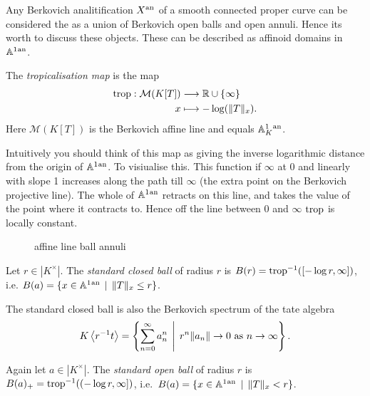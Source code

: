 Any Berkovich analitification $X{}^{\text{an}}$ of a smooth connected proper curve can be considered the as a union of Berkovich open balls and open annuli. 
Hence its worth to discuss these objects. 
These can be described as affinoid domains in $\mathbb{A}^{1}{}^{\text{an}}$. 

\begin{definition}
	The \emph{tropicalisation map} is the map 
	\begin{align*}
		\operatorname{trop} :  \mathcal{M} (K[T]) &\longrightarrow \mathbb{R} \cup \{\infty\}  \\
		x &\longmapsto -\log( \|T\|_x)
	.\end{align*}
	Here $\mathcal{M} (K[T])$ is the Berkovich affine line and equals $\mathbb{A}^{1}_K{}^{\text{an}}$. 
\end{definition}
Intuitively you should think of this map as giving the inverse logarithmic distance from the origin of $\mathbb{A}^{1}{}^{\text{an}}$. 
To visiualise this. This function if $\infty$ at $0$ and linearly with slope 1 increases along the path till $\infty$ (the extra point on the Berkovich projective line). 
The whole of $\mathbb{A}^{1}{}^{\text{an}} $ retracts on this line, and takes the value of the point where it contracts to. Hence off the line between $0$ and $\infty$  $\operatorname{trop}$ is locally constant. 

\begin{figure}[ht]
    \centering
    \caption{affine line ball annuli}
    \label{fig:affine-line-ball-annuli}
\end{figure}


\begin{definition}
	Let $r \in |K^{\times }|$. The \emph{standard closed ball} of radius $r$ is $B(r) = \operatorname{trop}^{-1}([-\log r, \infty])$, i.e. $B(a) = \{x \in \aff^{1}\an \st \|T\|_x \le r\} $. 
\end{definition}
The standard closed ball is also the Berkovich spectrum of the tate algebra \[
K\left<r^{-1}t \right> = \left\{\sum_{n = 0}^{\infty} a_n ^{n} \st r ^{n} \|a_n\| \to 0 \text{ as } n \to \infty \right\} 
.\] 
\begin{definition}
	Again let $a \in |K^{\times }|$. 
	The \emph{standard open ball} of radius $r$ is $B(a)_+ = \operatorname{trop}^{-1}((-\log r, \infty])$, i.e.\ $B(a) = \{x \in \aff^{1}\an \st \|T\|_x <  r\} $.
\end{definition}

